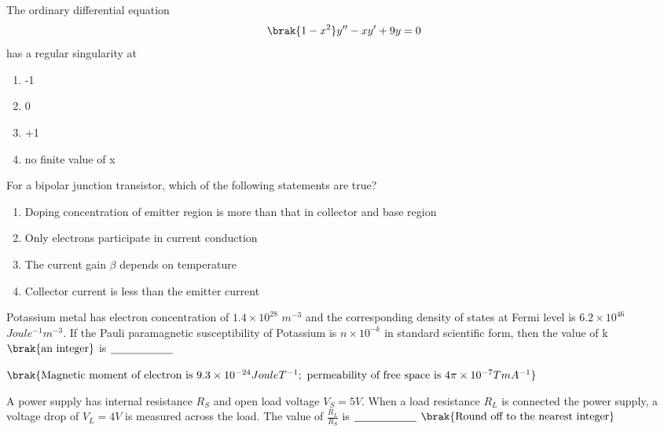 \iffalse
\chapter{2022}
\author{AI24BTECH11011}
\section{ph}
\fi

\item The ordinary differential equation
$$\brak{1 - x^2}y'' - xy' + 9y = 0$$
has a regular singularity at
\begin{enumerate}
    \item -1
    \item 0
    \item +1
    \item no finite value of x
\end{enumerate}

\item For a bipolar junction transistor, which of the following statements are true?
\begin{enumerate}
    \item Doping concentration of emitter region is more than that in collector and base region
    \item Only electrons participate in current conduction
    \item The current gain $\beta$ depends on temperature
    \item Collector current is less than the emitter current
\end{enumerate}

\item Potassium metal has electron concentration of $1.4 \times 10^{28}$  $m^{-3}$ and the corresponding density of states at Fermi level is $6.2 \times 10^{46}$ $Joule^{-1} m^{-3}$. If the Pauli paramagnetic susceptibility of Potassium is $n\times 10^{-k}$ in standard scientific form, then the value of k $\brak{\text{an integer}}$ is $\makebox[2cm][l]{\underline{\hspace{2cm}}}$

$\brak{\text{Magnetic moment of electron is } 9.3 \times 10^{-24} Joule T^{-1} ; \text{ permeability of free space is } 4\pi \times 10^{-7} TmA^{-1}}$

\item A power supply has internal resistance $R_S$ and open load voltage $V_S= 5V$. When a load resistance $R_L$ is connected the power supply, a voltage drop of $V_L = 4V$ is measured across the load. The value of $\frac{R_L}{R_S}$ is $\makebox[2cm][l]{\underline{\hspace{2cm}}}$
$\brak{\text{Round off to the nearest integer}}$


